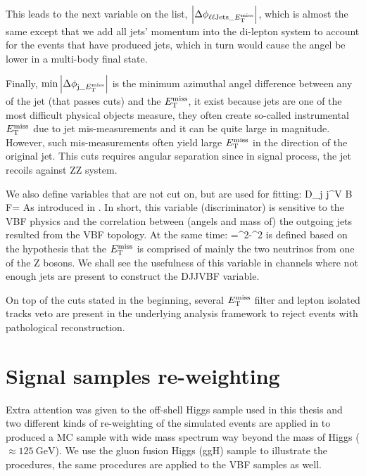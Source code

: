 This leads to the next variable on the list, $\abs{\Delta\phi_{\ell\ell\mathrm{Jets}\_E_{\mathrm{T}}^{\mathrm{miss}}}}$, which
is almost the same except that we add all jets' momentum into the di-lepton system to account
for the events that have produced jets, which in turn would cause the angel be lower in
a multi-body final state.

Finally, $\min{\abs{ \Delta\phi_{\mathrm{j}\_E_{\mathrm{T}}^{\mathrm{miss}}}}}$ is the minimum azimuthal angel difference between
any of the jet (that passes cuts) and the $E_{\mathrm{T}}^{\mathrm{miss}}$, it exist because jets are one of the 
most difficult physical objects measure, they often create so-called instrumental $E_{\mathrm{T}}^{\mathrm{miss}}$ due to jet
mis-measurements and it can be quite large in magnitude. However, such mis-measurements often yield large
$E_{\mathrm{T}}^{\mathrm{miss}}$ in the direction of the original jet. This cuts requires angular separation since in signal process,
the jet recoils against ZZ system.

We also define variables that are not cut on, but are used for fitting:
\be
D_{j j}^{V B F}=
\ee
As introduced in \cite{hig-18-002}. In short, this variable (discriminator) is sensitive
to the VBF physics and the correlation between (angels and mass of) the outgoing jets resulted from the
VBF topology. At the same time:
\be
\mtzz={}^2-^{2}
\ee
is defined based on the hypothesis that the $E_{\mathrm{T}}^{\mathrm{miss}}$ is comprised of mainly the two neutrinos
from one of the Z bosons. We shall see the usefulness of this variable in channels where
not enough jets are present to construct the DJJVBF variable.

On top of the cuts stated in the beginning, several $E_{\mathrm{T}}^{\mathrm{miss}}$ filter and lepton isolated tracks veto
are present in the underlying analysis framework to reject events with pathological reconstruction.

\section{Signal samples re-weighting}
\label{sec:sig_rewgt}
Extra attention was given to the off-shell Higgs sample used in this thesis and two different kinds
of re-weighting of the simulated events are applied in to produced a MC sample with wide
mass spectrum way beyond the mass of Higgs ($\approx \SI{125}{\giga\electronvolt}$). We use the
gluon fusion Higgs (ggH) sample to illustrate the procedures, the same procedures are applied to
the VBF samples as well.

